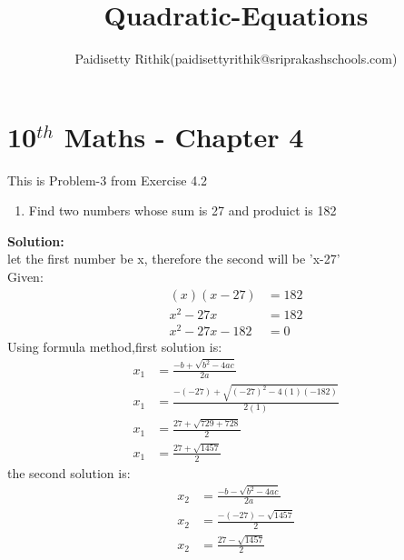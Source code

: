 \documentclass[12pt]{article}
\title{Quadratic-Equations}
\author{Paidisetty Rithik(paidisettyrithik@sriprakashschools.com)}
\newcommand{\solution}{\noindent \textbf{Solution: }}
\begin{document}
\maketitle
\section*{10$^{th}$ Maths - Chapter 4}
This is Problem-3 from Exercise 4.2
\begin{enumerate}
\item Find two numbers whose sum is 27 and produict is 182\\
\end{enumerate}
\solution \\
let the first number be x,
therefore the second will be 'x-27'\\
Given:\\
\begin{align}
(x)(x-27) &= 182\\
x^2-27x &= 182\\
x^2-27x-182 &= 0
\end{align}
Using formula method,first solution is:\\
\begin{align}
x_1 &= \frac{-b+\sqrt{b^2-4ac}}{2a}\\
x_1 &= \frac{-(-27)+\sqrt{(-27)^2-4(1)(-182)}}{2(1)}\\
x_1 &= \frac{27+\sqrt{729+728}}{2}\\
x_1 &= \frac{27+\sqrt{1457}}{2}
\end{align}
the second solution is:\\
\begin{align}
x_2 &= \frac{-b-\sqrt{b^2-4ac}}{2a}\\
x_2 &= \frac{-(-27)-\sqrt{1457}}{2}\\
x_2 &= \frac{27-\sqrt{1457}}{2}
\end{align}
\end{document}
